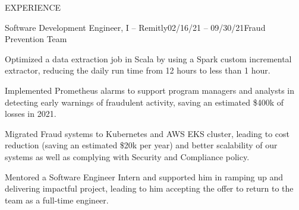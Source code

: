 \documentclass{resume} %
\begin{document}
\begin{rSection}{EXPERIENCE}
    \begin{rSubsection}{Software Development Engineer, I -- Remitly}{02/16/21 -- 09/30/21}{Fraud Prevention Team}{}
        \item Optimized a data extraction job in Scala by using a Spark custom incremental extractor, reducing the daily run time from 12 hours to less than 1 hour.
        \item Implemented Prometheus alarms to support program managers and analysts in detecting early warnings of fraudulent activity, saving an estimated \$400k of losses in 2021.
        \item Migrated Fraud systems to Kubernetes and AWS EKS cluster, leading to cost reduction (saving an estimated \$20k per year) and better scalability of our systems as well as complying with Security and Compliance policy.
        \item Mentored a Software Engineer Intern and supported him in ramping up and delivering impactful project, leading to him accepting the offer to return to the team as a full-time engineer.
    \end{rSubsection}
    

\end{rSection}
\end{document}
